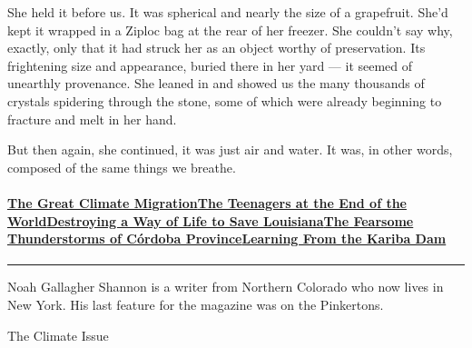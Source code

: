 She held it before us. It was spherical and nearly the size of a
grapefruit. She'd kept it wrapped in a Ziploc bag at the rear of her
freezer. She couldn't say why, exactly, only that it had struck her as
an object worthy of preservation. Its frightening size and appearance,
buried there in her yard --- it seemed of unearthly provenance. She
leaned in and showed us the many thousands of crystals spidering through
the stone, some of which were already beginning to fracture and melt in
her hand.

But then again, she continued, it was just air and water. It was, in
other words, composed of the same things we breathe.

\hypertarget{the-great-climate-migrationthe-teenagers-at-the-end-of-the-worlddestroying-a-way-of-life-to-save-louisianathe-fearsome-thunderstorms-of-cuxf3rdoba-provincelearning-from-the-kariba-dam}{%
\paragraph{\texorpdfstring{\href{https://www.nytimes.com/interactive/2020/07/23/magazine/climate-migration.html}{The
Great Climate
Migration}\href{https://www.nytimes.com/interactive/2020/07/21/magazine/teenage-activist-climate-change.html}{The
Teenagers at the End of the
World}\href{https://www.nytimes.com/interactive/2020/07/21/magazine/louisiana-coast-engineering.html}{Destroying
a Way of Life to Save
Louisiana}\href{https://www.nytimes.com/interactive/2020/07/22/magazine/worst-storms-argentina.html}{The
Fearsome Thunderstorms of Córdoba
Province}\href{https://www.nytimes.com/interactive/2020/07/22/magazine/zambia-kariba-dam.html}{Learning
From the Kariba
Dam}}{The Great Climate MigrationThe Teenagers at the End of the WorldDestroying a Way of Life to Save LouisianaThe Fearsome Thunderstorms of Córdoba ProvinceLearning From the Kariba Dam}}\label{the-great-climate-migrationthe-teenagers-at-the-end-of-the-worlddestroying-a-way-of-life-to-save-louisianathe-fearsome-thunderstorms-of-cuxf3rdoba-provincelearning-from-the-kariba-dam}}

\begin{center}\rule{0.5\linewidth}{\linethickness}\end{center}

Noah Gallagher Shannon is a writer from Northern Colorado who now lives
in New York. His last feature for the magazine was on the Pinkertons.

The Climate Issue


